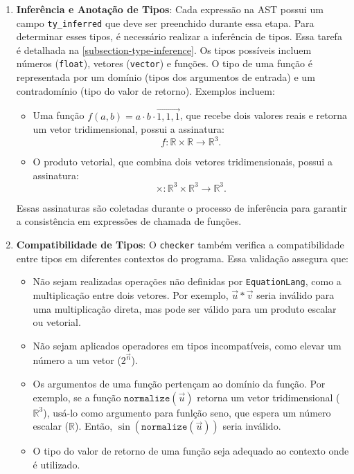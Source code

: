 \begin{enumerate}
    \item \textbf{Inferência e Anotação de Tipos}:
    Cada expressão na AST possui um campo \verb"ty_inferred" que deve ser preenchido durante essa etapa. Para determinar esses tipos, é necessário realizar a inferência de tipos. Essa tarefa é detalhada na \autoref{subsection-type-inference}. Os tipos possíveis incluem números (\verb"float"), vetores (\verb"vector") e funções.
        O tipo de uma função é representada por um domínio (tipos dos argumentos de entrada) e um contradomínio (tipo do valor de retorno). Exemplos incluem:
        \begin{itemize}
            \item Uma função $f(a, b) = a \cdot b \cdot \vec{1,1,1}$, que recebe dois valores reais e retorna um vetor tridimensional, possui a assinatura:
            \[
            f : \mathbb{R} \times \mathbb{R} \to \mathbb{R}^3.
            \]
            \item O produto vetorial, que combina dois vetores tridimensionais, possui a assinatura:
            \[
            \times : \mathbb{R}^3 \times \mathbb{R}^3 \to \mathbb{R}^3.
            \]
        \end{itemize}
        Essas assinaturas são coletadas durante o processo de inferência para garantir a consistência em expressões de chamada de funções.

    \item \textbf{Compatibilidade de Tipos}:
    O \texttt{checker} também verifica a compatibilidade entre tipos em diferentes contextos do programa. Essa validação assegura que:
    \begin{itemize}
        \item Não sejam realizadas operações não definidas por \texttt{EquationLang}, como a multiplicação entre dois vetores. Por exemplo, $\vec{u} * \vec{v}$ seria inválido para uma multiplicação direta, mas pode ser válido para um produto escalar ou vetorial.

        \item Não sejam aplicados operadores em tipos incompatíveis, como elevar um número a um vetor ($2^{\vec{n}}$).

        \item Os argumentos de uma função pertençam ao domínio da função. Por exemplo, se a função $\texttt{normalize}(\vec{u})$ retorna um vetor tridimensional ($\mathbb{R}^3$), usá-lo como argumento para funlção seno, que espera um número escalar ($\mathbb{R}$). Então, $\sin(\texttt{normalize}(\vec{u}))$ seria inválido.
        \item O tipo do valor de retorno de uma função seja adequado ao contexto onde é utilizado.
    \end{itemize}


\end{enumerate}
